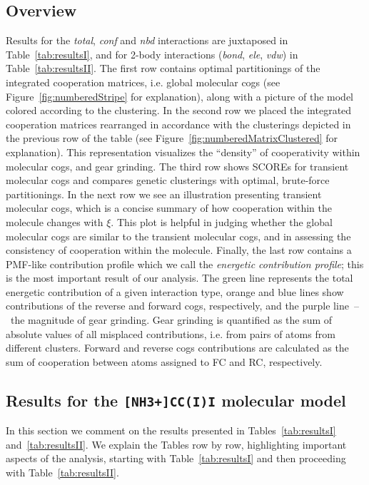 \subsection*{Overview}
\label{sec:overview}
Results for the \emph{total}, \emph{conf} and \emph{nbd} interactions are juxtaposed in Table~\ref{tab:resultsI}, and for 2-body interactions (\emph{bond}, \emph{ele}, \emph{vdw}) in Table~\ref{tab:resultsII}.
{\color{black}
The first row contains optimal partitionings of the integrated cooperation matrices, i.e. global molecular cogs (see Figure~\ref{fig:numberedStripe} for explanation), along with a picture of the model colored according to the clustering.
In the second row we placed the integrated cooperation matrices rearranged in accordance with the clusterings depicted in the previous row of the table (see Figure~\ref{fig:numberedMatrixClustered} for explanation).
This representation visualizes the ``density'' of cooperativity within molecular cogs{\color{black},} and gear grinding.
}The {\color{black}third} row shows SCOREs for transient molecular cogs and compares genetic clusterings with optimal, brute-force partitionings.
{\color{black}In the next row we see an} illustration presenting transient molecular cogs, which is a concise summary of how cooperation within the molecule changes with $\xi$.
{\color{black}This plot is helpful in judging whether the global molecular cogs are similar to the transient molecular cogs, and in assessing the consistency of cooperation within the molecule.}
Finally, the last row contains a PMF-like contribution profile {\color{black}which we call the \emph{energetic contribution profile}}; this is the most important result of our analysis.
The green line represents the total energetic contribution of a given interaction type, orange and blue lines show contributions of the reverse and forward cogs{\color{black}, respectively}, and the purple line~--~{\color{black}the magnitude of} gear grinding.
Gear grinding is quantified as the sum of absolute values of all misplaced contributions, i.e. from pairs of atoms from different clusters.
Forward and reverse cogs contributions are calculated as the sum of cooperation between atoms assigned to FC and RC, respectively.

\subsection*{Results for the {\color{black}\texttt{[NH3+]CC(I)I}} molecular model}
{\color{black}
In this section we comment on the results presented in Tables~\ref{tab:resultsI} and~\ref{tab:resultsII}.
We explain the Tables row by row, highlighting important aspects of the analysis, starting with Table~\ref{tab:resultsI} and then proceeding with Table~\ref{tab:resultsII}.
}

